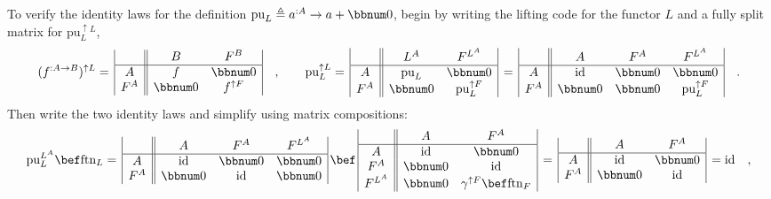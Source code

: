 To verify the identity laws for the definition $\text{pu}_{L}\triangleq a^{:A}\rightarrow a+\bbnum 0$,
begin by writing the lifting code for the functor $L$ and a fully
split matrix for $\text{pu}_{L}^{\uparrow L}$,
\[
(f^{:A\rightarrow B})^{\uparrow L}=\,\begin{array}{|c||cc|}
 & B & F^{B}\\
\hline A & f & \bbnum 0\\
F^{A} & \bbnum 0 & f^{\uparrow F}
\end{array}\quad,\quad\quad\text{pu}_{L}^{\uparrow L}=\,\begin{array}{|c||cc|}
 & L^{A} & F^{L^{A}}\\
\hline A & \text{pu}_{L} & \bbnum 0\\
F^{A} & \bbnum 0 & \text{pu}_{L}^{\uparrow F}
\end{array}\,=\,\begin{array}{|c||ccc|}
 & A & F^{A} & F^{L^{A}}\\
\hline A & \text{id} & \bbnum 0 & \bbnum 0\\
F^{A} & \bbnum 0 & \bbnum 0 & \text{pu}_{L}^{\uparrow F}
\end{array}\quad.
\]
Then write the two identity laws and simplify using matrix compositions:
\[
\text{pu}_{L}^{L^{A}}\bef\text{ftn}_{L}=\,\begin{array}{|c||ccc|}
 & A & F^{A} & F^{L^{A}}\\
\hline A & \text{id} & \bbnum 0 & \bbnum 0\\
F^{A} & \bbnum 0 & \text{id} & \bbnum 0
\end{array}\,\bef\,\begin{array}{|c||cc|}
 & A & F^{A}\\
\hline A & \text{id} & \bbnum 0\\
F^{A} & \bbnum 0 & \text{id}\\
F^{L^{A}} & \bbnum 0 & \gamma^{\uparrow F}\bef\text{ftn}_{F}
\end{array}\,=\,\begin{array}{|c||cc|}
 & A & F^{A}\\
\hline A & \text{id} & \bbnum 0\\
F^{A} & \bbnum 0 & \text{id}
\end{array}\,=\text{id}\quad,
\]

